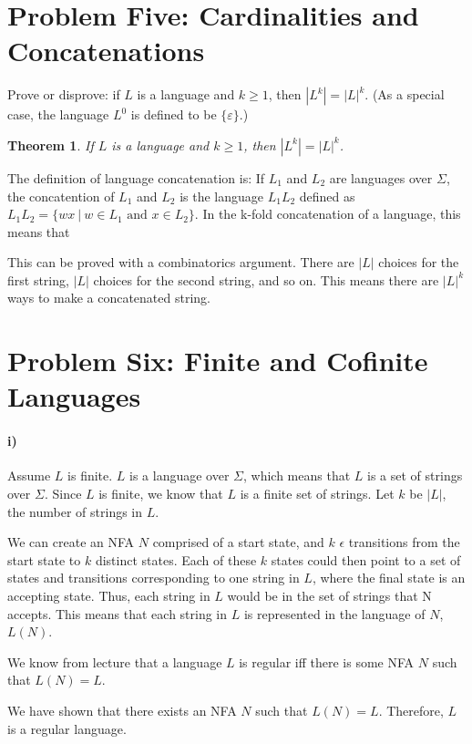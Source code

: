 \documentclass[10pt,letter]{article}
\newtheorem*{thm}{Theorem}
\begin{document}
\section*{Problem Five: Cardinalities and Concatenations}
Prove or disprove: if $L$ is a language and $k \ge 1$, then $|L^k| = |L|^k$. (As a special case, the language $L^0$ is defined to be $\{\varepsilon\}$.)

\begin{thm}
If $L$ is a language and $k \ge 1$, then $|L^k| = |L|^k$.
\end{thm}

The definition of language concatenation is: If $L_1$ and $L_2$ are languages over $\Sigma$, the concatention of $L_1$ and $L_2$ is the language $L_1L_2$ defined as $L_1L_2 = \{ wx \ | \ w \in L_1 \text{ and } x \in L_2 \}$. In the k-fold concatenation of a language, this means that 

This can be proved with a combinatorics argument. There are $|L|$ choices for the first string, $|L|$ choices for the second string, and so on. This means there are $|L|^k$ ways to make a concatenated string. 

\section*{Problem Six: Finite and Cofinite Languages}

\paragraph{i)} 

Assume $L$ is finite. $L$ is a language over $\Sigma$, which means that $L$ is a set of strings over $\Sigma$. Since $L$ is finite, we know that $L$ is a finite set of strings. Let $k$ be $|L|$, the number of strings in $L$.

We can create an NFA $N$ comprised of a start state, and $k$ $\epsilon$ transitions from the start state to $k$ distinct states. Each of these $k$ states could then point to a set of states and transitions corresponding to one string in $L$, where the final state is an accepting state. Thus, each string in $L$ would be in the set of strings that N accepts. This means that each string in $L$ is represented in the language of $N$, $L(N)$.

We know from lecture that a language $L$ is regular iff there is some NFA $N$ such that $L(N) = L$.

We have shown that there exists an NFA $N$ such that $L(N) = L$. Therefore, $L$ is a regular language.
\end{document}
